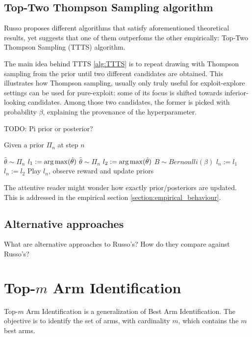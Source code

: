 \subsection{Top-Two Thompson Sampling algorithm}

Russo proposes different algorithms that satisfy aforementioned theoretical results, yet suggests that one of them outperfoms the other empirically: Top-Two Thompson Sampling (TTTS) algorithm.

The main idea behind TTTS \ref{alg:TTTS} is to repeat drawing with Thompson sampling from the prior until two different candidates are obtained. This illustrates how Thompson sampling, usually only truly useful for exploit-explore settings can be used for pure-exploit: some of its focus is shifted towards inferior-looking candidates. Among those two candidates, the former is picked with probability $\beta$, explaining the provenance of the hyperparameter.

TODO: Pi prior or posterior?
\begin{algorithm}[H]
    \caption{Given a prior $\Pi_n$ at step $n$}
    \label{alg:TTTS}
  \begin{algorithmic}
    \State $\hat{\theta} \sim \Pi_n$
    \State $l_1 := \operatorname*{arg\,max}(\hat{\theta})$
    \Repeat
      \State $\hat{\theta} \sim \Pi_n$
      \State $l_2 := \operatorname*{arg\,max}(\hat{\theta})$
    \State $B \sim Bernoulli(\beta)$
      \State $l_n := l_1$
    \Else
      \State $l_n := l_2$
    \EndIf
    \State Play $l_n$, observe reward and update priors
  \end{algorithmic}
\end{algorithm}

The attentive reader might wonder how exactly prior/posteriors are updated. This is addressed in the empirical section \ref{section:empirical_behaviour}.

\subsection{Alternative approaches}
What are alternative approaches to Russo's?
How do they compare against Russo's?

\section{Top-$m$ Arm Identification}

Top-$m$ Arm Identification is a generalization of Best Arm Identification. The objective is to identify the set of arms, with cardinality $m$, which contains the $m$ best arms.


